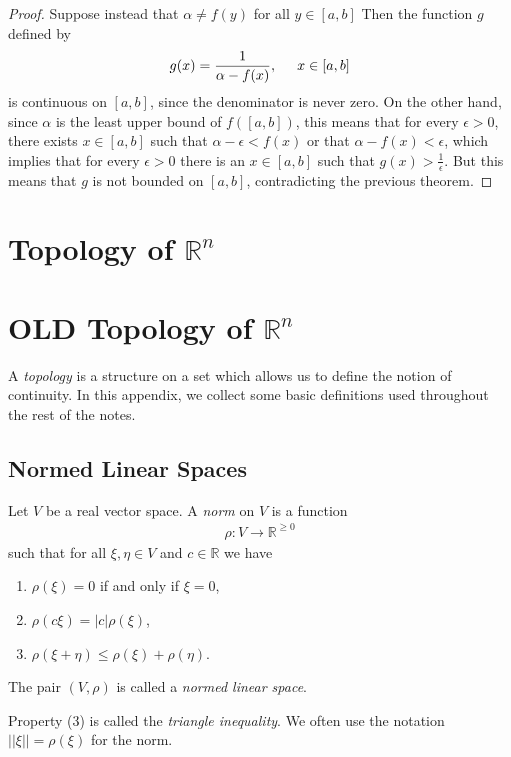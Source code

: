 \documentclass[12pt,letterpaper,reqno]{article}
\numberwithin{equation}{section}
\newcommand{\R}{\ensuremath{\mathbb R}}
\begin{document}
{\begin{proof}
	Suppose instead that $\alpha \neq f(y)$ for all $y \in [a,b]$ Then the function $g$ defined by
	\begin{align*}
		g(x)=\frac{1}{\alpha-f(x)}, \hspace{0.5cm} x \in [a,b]
	\end{align*}
	is continuous on $[a,b]$, since the denominator is never zero. On the other hand, since $\alpha$ is the least upper bound of $f([a,b])$, this means that for every $\epsilon>0$, there exists $x \in [a,b]$ such that $\alpha-\epsilon<f(x)$ or that $\alpha-f(x)<\epsilon$, which implies that for every $\epsilon>0$ there is an $x \in [a,b]$ such that $g(x)>\frac{1}{\epsilon}$. But this means that $g$ is not bounded on $[a,b]$, contradicting the previous theorem.
\end{proof}

\section{Topology of $\R^n$}




\section{OLD Topology of $\R^n$}\label{app:topology}
A \emph{topology} is a structure on a set which allows us to define the notion of continuity. In this appendix, we collect some basic definitions used throughout the rest of the notes.
\subsection{Normed Linear Spaces}
\begin{defn}
	Let $V$ be a real vector space. A \emph{norm} on $V$ is a function
	\begin{align*}
		\rho:V \to \R^{\geq 0}
	\end{align*}
	such that for all $\xi,\eta \in V$ and $c \in \R$ we have
	\begin{enumerate}
		\item $\rho(\xi)=0$ if and only if $\xi=0$,
		\item $\rho(c\xi)=|c|\rho(\xi)$,
		\item $\rho(\xi+\eta) \leq \rho(\xi)+\rho(\eta)$.
	\end{enumerate}
	The pair $(V,\rho)$ is called a \emph{normed linear space}. 
	
	Property (3) is called the \emph{triangle inequality}. We often use the notation $||\xi||=\rho(\xi)$ for the norm.
\end{defn}

}
\end{document}
